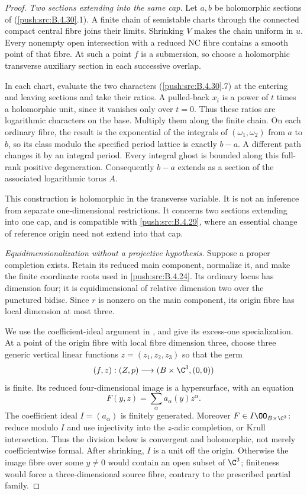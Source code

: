 \begin{proof}
\emph{Two sections extending into the same cap.}
Let $a,b$ be holomorphic sections of (\ref{push:src:B.4.30}.1).
A finite chain of semistable charts through the
connected compact central fibre joins their
limits. Shrinking $V$ makes the chain uniform
in $u$. Every nonempty open intersection with
a reduced NC fibre contains a smooth point of
that fibre. At such a point $f$ is a
submersion, so choose a holomorphic transverse
auxiliary section in each successive overlap.

In each chart, evaluate the two characters
(\ref{push:src:B.4.30}.7) at the entering and leaving sections
and take their ratios. A pulled-back $x_i$
is a power of $t$ times a holomorphic unit,
since it vanishes only over $t=0$. Thus these
ratios are logarithmic characters on the base.
Multiply them along the finite chain. On each
ordinary fibre, the result is the exponential
of the integrals of $(\omega_1,\omega_2)$ from
$a$ to $b$, so its class modulo the specified
period lattice is exactly $b-a$. A different
path changes it by an integral period. Every
integral ghost is bounded along this full-rank
positive degeneration. Consequently $b-a$
extends as a section of the associated
logarithmic torus $A$.

This construction is holomorphic in the
transverse variable. It is not an inference
from separate one-dimensional restrictions.
It concerns two sections extending into one
cap, and is compatible with \ref{push:src:B.4.29}, where an
essential change of reference origin need not
extend into that cap.

\emph{Equidimensionalization without a projective hypothesis.}
Suppose a proper completion exists. Retain its
reduced main component, normalize it, and make
the finite coordinate roots used in \ref{push:src:B.4.24}.
Its ordinary locus has dimension four; it is
equidimensional of relative dimension two
over the punctured bidisc. Since $r$ is
nonzero on the main component, its origin
fibre has local dimension at most three.

We use the coefficient-ideal argument in
\citet[Corollary 1.2 and its proof,
manuscript pp.~3--5]{Parusinski1990E}, and give
its excess-one specialization. At a point of
the origin fibre with local fibre dimension
three, choose three generic vertical linear
functions $z=(z_1,z_2,z_3)$ so that the germ
\[
 (f,z): (Z,p)\longrightarrow(B\times\C^3,(0,0))
\]
is finite. Its reduced four-dimensional image
is a hypersurface, with an equation
\[
 F(y,z)=\sum_\alpha a_\alpha(y)z^\alpha.
 \tag{B.4.30.8}
\]
The coefficient ideal $I=(a_\alpha)$ is finitely
generated. Moreover $F\in I\OO_{B\times\C^3}$:
reduce modulo $I$ and use injectivity into
the $z$-adic completion, or Krull intersection.
Thus the division below is convergent and
holomorphic, not merely coefficientwise formal.
After shrinking, $I$ is a unit off the origin. Otherwise the image fibre over
some $y\ne0$ would contain an open subset of
$\C^3$; finiteness would force a
three-dimensional source fibre, contrary to
the prescribed partial family.


\end{proof}
